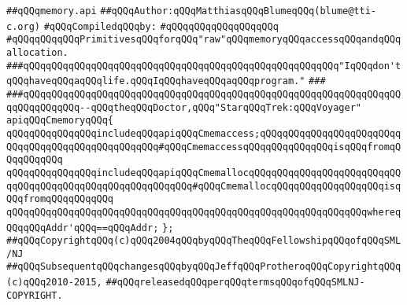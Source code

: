 \label{src/lib/c-glue-lib/ram/memory.api}
\verb|##qQQqmemory.api|\newline
\verb|##qQQqAuthor:qQQqMatthiasqQQqBlumeqQQq(blume@tti-c.org)|\newline
\newline
\verb|#qQQqCompiledqQQqby:|\newline
\verb|#qQQqqQQqqQQqqQQqqQQq|\newline
\newline
\newline
\newline
\verb|#qQQqqQQqqQQqPrimitivesqQQqforqQQq"raw"qQQqmemoryqQQqaccessqQQqandqQQqallocation.|\newline
\newline
\newline
\newline
\verb|###qQQqqQQqqQQqqQQqqQQqqQQqqQQqqQQqqQQqqQQqqQQqqQQqqQQqqQQq"IqQQqdon'tqQQqhaveqQQqaqQQqlife.qQQqIqQQqhaveqQQqaqQQqprogram."|\newline
\verb|###|\newline
\verb|###qQQqqQQqqQQqqQQqqQQqqQQqqQQqqQQqqQQqqQQqqQQqqQQqqQQqqQQqqQQqqQQqqQQqqQQqqQQqqQQq--qQQqtheqQQqDoctor,qQQq"StarqQQqTrek:qQQqVoyager"|\newline
\newline
\newline
\newline
\verb|apiqQQqCmemoryqQQq{|\newline
\newline
\verb|qQQqqQQqqQQqqQQqincludeqQQqapiqQQqCmemaccess;qQQqqQQqqQQqqQQqqQQqqQQqqQQqqQQqqQQqqQQqqQQqqQQqqQQq#qQQqCmemaccessqQQqqQQqqQQqqQQqisqQQqfromqQQqqQQqqQQq|\newline
\verb|qQQqqQQqqQQqqQQqincludeqQQqapiqQQqCmemallocqQQqqQQqqQQqqQQqqQQqqQQqqQQqqQQqqQQqqQQqqQQqqQQqqQQqqQQqqQQq#qQQqCmemallocqQQqqQQqqQQqqQQqqQQqisqQQqfromqQQqqQQqqQQq|\newline
\verb|qQQqqQQqqQQqqQQqqQQqqQQqqQQqqQQqqQQqqQQqqQQqqQQqqQQqqQQqqQQqqQQqwhereqQQqqQQqAddr'qQQq==qQQqAddr;|\newline
\verb|};|\newline
\newline
\newline
\verb|##qQQqCopyrightqQQq(c)qQQq2004qQQqbyqQQqTheqQQqFellowshipqQQqofqQQqSML/NJ|\newline
\verb|##qQQqSubsequentqQQqchangesqQQqbyqQQqJeffqQQqProtheroqQQqCopyrightqQQq(c)qQQq2010-2015,|\newline
\verb|##qQQqreleasedqQQqperqQQqtermsqQQqofqQQqSMLNJ-COPYRIGHT.|\newline

